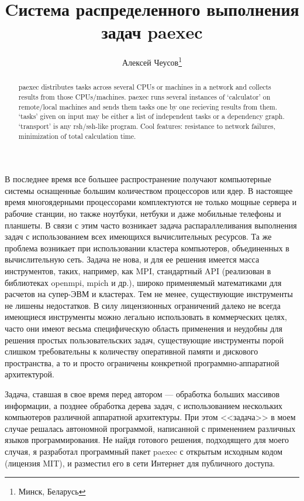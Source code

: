 \documentclass[10pt, a5paper]{article}
\begin{document}
\title{Cистема распределенного выполнения задач paexec }
\author{Алексей Чеусов\footnote{Минск, Беларусь}}
\def\progref!#1!{\texttt{#1}}

\maketitle

\begin{abstract}paexec distributes tasks across several CPUs or machines in a
network and collects results from those CPUs/machines. paexec runs
several instances of `calculator' on remote/local machines and sends
them tasks one by one recieving results from them. `tasks' given on
input may be either a list of independent tasks or a dependency
graph. `transport' is any rsh/ssh-like program. Cool features:
resistance to network failures, minimization of total calculation
time.
\end{abstract}

В последнее время все большее распространение получают компьютерные
системы оснащенные большим количеством процессоров или ядер.  В
настоящее время многоядерными процессорами комплектуются не только
мощные сервера и рабочие станции, но также ноутбуки, нетбуки и
даже мобильные телефоны и планшеты. В связи с этим часто возникает
задача распараллеливания выполнения задач с использованием всех
имеющихся вычислительных ресурсов. Та же проблема возникает при
использовании кластера компьютеров, объединенных в вычислительную
сеть. Задача не нова, и для ее решения имеется масса инструментов,
таких, например, как MPI, стандартный API (реализован в библиотеках
openmpi, mpich и др.), широко применяемый математиками для расчетов на
супер-ЭВМ и кластерах.  Тем не менее, существующие инструменты не
лишены недостатков.  В силу лицензионных ограничений далеко не всегда
имеющиеся инструменты можно легально использовать в коммерческих
целях, часто они имеют весьма специфическую область применения и
неудобны для решения простых пользовательских задач, существующие
инструменты порой слишком требовательны к количеству оперативной
памяти и дискового пространства, а то и просто ограничены конкретной
программно-аппаратной архитектурой.

Задача, ставшая в свое время перед автором --- обработка больших
массивов информации, а позднее обработка дерева задач, с
использованием нескольких компьютеров различной аппаратной
архитектуры. При этом <<задача>> в моем случае решалась автономной
программой, написанной с применением различных языков
программирования. Не найдя готового решения, подходящего для моего
случая, я разработал программный пакет paexec с открытым исходным
кодом (лицензия MIT), и разместил его в сети Интернет для публичного
доступа.
\end{document}
